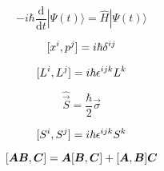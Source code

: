 \begin{equation}
    -i \hbar \frac{\mathrm{d}}{\mathrm{d}t} |\Psi(t)\rangle = \hat{H} |\Psi(t) \rangle
\end{equation}


\begin{equation}
    [x^{i},p^{j}] = i \hbar \delta^{ij}
\end{equation}

\begin{equation}
    [L^{i},L^{j}] = i\hbar \epsilon^{ijk}L^{k}
\end{equation}

\begin{equation}
    \hat{\vec{S}} = \frac{\hbar}{2} \vec{\sigma}
\end{equation}

\begin{equation}
    [S^{i},S^{j}] = i\hbar \epsilon^{ijk}S^{k}
\end{equation}

\begin{equation}
    [\boldsymbol{A} \boldsymbol{B},\boldsymbol{C}] = \boldsymbol{A}[\boldsymbol{B},\boldsymbol{C}] + [\boldsymbol{A},\boldsymbol{B}]\boldsymbol{C}
\end{equation}
